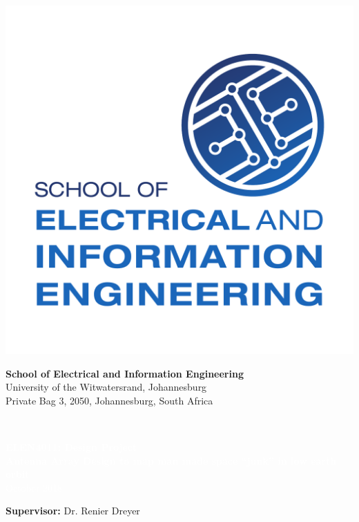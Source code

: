 \documentclass[11pt]{witseiepaper}
\begin{document}
\begin{bibunit}[witseie]


\thispagestyle{empty}
\pagestyle{plain}
\onecolumn
\begin{minipage}{0.16\textwidth}
    \includegraphics[width=\textwidth,height=\textwidth]{logo.pdf}
\end{minipage}
\begin{minipage}{0.8\textwidth}
    \centering
    \textbf{\Large School of Electrical and Information Engineering}\\
    {\large University of the Witwatersrand, Johannesburg}\\
    {\small Private Bag 3, 2050, Johannesburg, South Africa}\\
\end{minipage}
\vspace{.3cm}\\
\colorbox{myblue}{\begin{minipage}{0.98\textwidth}
        \begin{center}
        	\centering
            \textcolor{white}{\textbf{\Large{ELEN4011: Design Project}}\\
                \textbf{Antenna Array Design to map man made space “junk” in low earth orbit}\\
                October 2018
            }
        \end{center}
    \end{minipage}
}
\vspace{3cm}
\begin{center}
\textbf{Supervisor:} Dr. Renier Dreyer\\


\end{center}
\end{bibunit}
\end{document}
